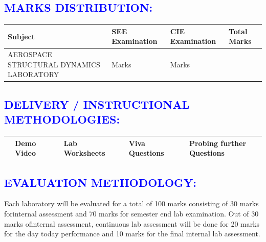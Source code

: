 \documentclass[11pt]{exam}
\newcommand*{\boldcheckmark}{%
	\textpdfrender{
		TextRenderingMode=FillStroke,
		LineWidth=.5pt, %
	}{\checkmark}%
}
\begin{document}
\begin{flushleft}\vspace{-0.75cm}
\textcolor{blue}{\section{\large \bfseries MARKS DISTRIBUTION:}}
	\begin{tabular}{|>{\centering\arraybackslash}p{5cm}  | >{\centering\arraybackslash}p{3.75cm}  |   >{\centering\arraybackslash}p{3.75cm} |>{\centering\arraybackslash}p{2.8cm}|}
		\hline 
	\textbf{Subject}&	\textbf{SEE Examination}&	\textbf{CIE Examination}&	\textbf{Total Marks}\\ 
	\hline
AEROSPACE STRUCTURAL DYNAMICS LABORATORY	&	70 Marks&	30 Marks&	100\\ 
	\hline
	\end{tabular}
\end{flushleft}\vspace{-1cm}
\begin{flushleft}
\textcolor{blue}{\section{\large \bfseries DELIVERY / INSTRUCTIONAL METHODOLOGIES:}}
	\begin{tabular}{|>{\centering\arraybackslash}p{0.3cm}  | >{\centering\arraybackslash}p{2.3cm}  |   >{\centering\arraybackslash}p{0.5cm} |>{\centering\arraybackslash}p{2.4cm}|>{\centering\arraybackslash}p{0.5cm}  | >{\centering\arraybackslash}p{3cm}  |   >{\centering\arraybackslash}p{0.5cm} |>{\centering\arraybackslash}p{4cm}|}
	\hline 

\boldcheckmark &  Demo Video  & \boldcheckmark& Lab Worksheets &  \boldcheckmark & Viva Questions  & \boldcheckmark &  Probing further Questions \\ \hline
\end{tabular}
\end{flushleft}
\vspace{-2.5cm}
\newpage
\textcolor{blue}{\section{\large \bfseries EVALUATION METHODOLOGY:}}
Each laboratory will be evaluated for a total of 100 marks consisting of 30 marks forinternal assessment and 70 marks for semester end lab examination. Out of 30 marks ofinternal assessment, continuous lab assessment will be done for 20 marks for the day today performance and 10 marks for the final internal lab assessment. \\
\end{document}
